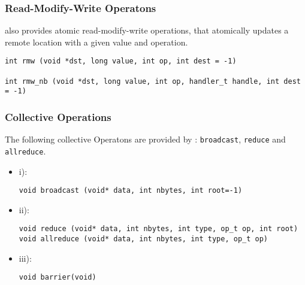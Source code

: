 \subsubsection {Read-Modify-Write Operatons}

\Xtenlib{} also provides atomic read-modify-write operations, that
atomically updates a remote location with a given value and
operation. 

\begin{verbatim}
int rmw (void *dst, long value, int op, int dest = -1)

int rmw_nb (void *dst, long value, int op, handler_t handle, int dest = -1)
\end{verbatim}



\subsubsection {Collective Operations}
The following collective Operatons are provided by \Xtenlib{} : {\tt broadcast},
{\tt reduce} and {\tt allreduce}. 

\begin{itemize}
\item i):
\begin{verbatim}
void broadcast (void* data, int nbytes, int root=-1)
\end{verbatim}

\item ii):

\begin{verbatim}
void reduce (void* data, int nbytes, int type, op_t op, int root)
void allreduce (void* data, int nbytes, int type, op_t op)
\end{verbatim}

\item iii):

\begin{verbatim}
void barrier(void)
\end{verbatim}

\end {itemize}

